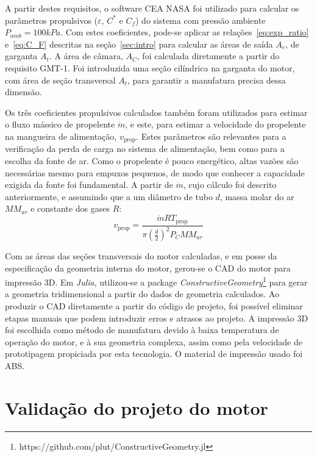 A partir destes requisitos, o software CEA NASA foi utilizado para calcular os parâmetros propulsivos (\(\varepsilon \), \(C^\ast \) e \(C_f\)) do sistema com pressão ambiente \(P_{amb} = 100kPa\). Com estes coeficientes, pode-se aplicar as relações~\ref{eq:exp_ratio} e~\ref{eq:C_F} descritas na seção~\ref{sec:intro} para calcular as áreas de saída \(A_e\), de garganta \(A_t\). A área de câmara, \(A_C\), foi calculada diretamente a partir do requisito GMT-1. Foi introduzida uma seção cilíndrica na garganta do motor, com área de seção transversal \(A_t\), para garantir a manufatura precisa dessa dimensão.

Os três coeficientes propulsivos calculados também foram utilizados para estimar o fluxo mássico de propelente \(\dot{m}\), e este, para estimar a velocidade do propelente na mangueira de alimentação, \(v_{\text{prop}}\). Estes parâmetros são relevantes para a verificação da perda de carga no sistema de alimentação, bem como para a escolha da fonte de ar. Como o propelente é pouco energético, altas vazões são necessárias mesmo para empuxos pequenos, de modo que conhecer a capacidade exigida da fonte foi fundamental. A partir de \(\dot{m}\), cujo cálculo foi descrito anteriormente, e assumindo que a  um diâmetro de tubo \(d\), massa molar do ar \(MM_{ar}\) e constante dos gases \(R\):
\begin{equation}
    v_{\text{prop}} = \frac{\dot{m} R T_{\text{prop}}}{\pi \left(\frac{d}{2}\right)^2 P_C MM_{ar}}
\end{equation}

Com as áreas das seções transversais do motor calculadas, e em posse da especificação da geometria interna do motor, gerou-se o CAD do motor para impressão 3D. Em \textit{Julia}, utilizou-se a package \textit{ConstructiveGeometry}\footnote[1]{https://github.com/plut/ConstructiveGeometry.jl} para gerar a geometria tridimensional a partir do dados de geometria calculados. Ao produzir o CAD diretamente a partir do código de projeto, foi possível eliminar etapas manuais que podem introduzir erros e atrasos ao projeto. A impressão 3D foi escolhida como método de manufatura devido à baixa temperatura de operação do motor, e à sua geometria complexa, assim como pela velocidade de prototipagem propiciada por esta tecnologia. O material de impressão usado foi ABS.\@

\section{Validação do projeto do motor}\label{sec:method_validation}

